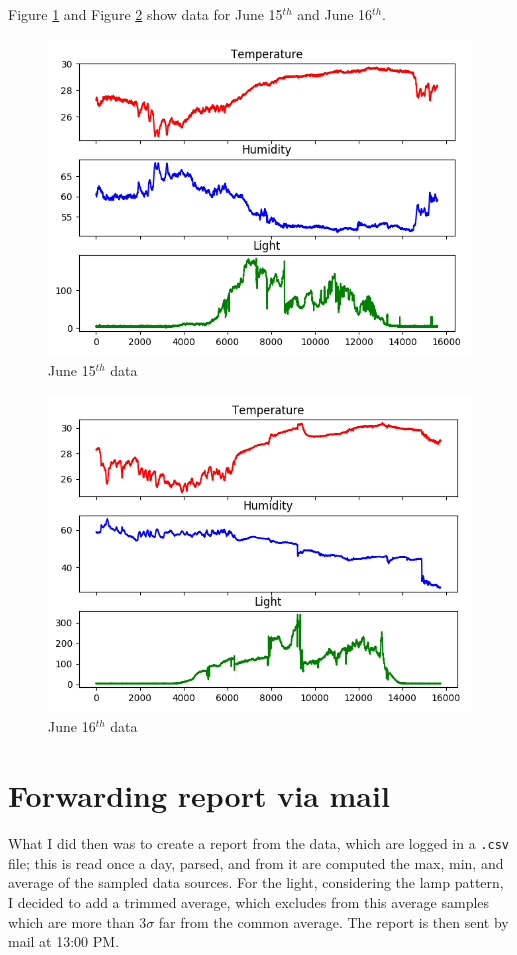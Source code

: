 \documentclass[11pt]{article}
\begin{document}
Figure \ref{fig:june15} and Figure \ref{fig:june16} show data for June 15$^{th}$ and June 16$^{th}$.


\begin{figure}[h]
\includegraphics[width=\textwidth]{log-20170515}
\caption{June 15$^{th}$ data}
\label{fig:june15}
\end{figure}

\begin{figure}[h]
\includegraphics[width=\textwidth]{log-20170516}
\caption{June 16$^{th}$ data}
\label{fig:june16}
\end{figure}

\section{Forwarding report via mail}
What I did then was to create a report from the data, which are logged in a \texttt{.csv} file; this is read once a day, parsed, and from it are computed the max, min, and average of the sampled data sources. For the light, considering the lamp pattern, I decided to add a trimmed average, which excludes from this average samples which are more than $3\sigma$ far from the common average. The report is then sent by mail at 13:00 PM.
\end{document}
